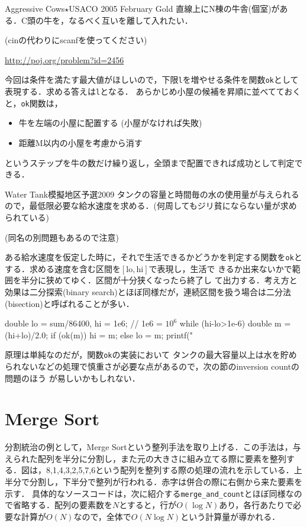 \begin{pbox}{Aggressive Cows$\star{}$}{USACO 2005 February Gold}
直線上にN棟の牛舎(個室)がある．C頭の牛を，なるべく互いを離して入れたい．

(cinの代わりにscanfを使ってください)

\url{http://poj.org/problem?id=2456}
\end{pbox}

今回は条件を満たす最大値がほしいので，下限\texttt{l}を増やせる条件を関数\texttt{ok}として表現する．求める答えは\texttt{l}となる．
あらかじめ小屋の候補を昇順に並べてておくと，\texttt{ok}関数は，
\begin{itemize}
\setlength{\itemsep}{0pt}
\item 牛を左端の小屋に配置する (小屋がなければ失敗)
\item 距離M以内の小屋を考慮から消す
\end{itemize}
というステップを牛の数だけ繰り返し，全頭まで配置できれば成功として判定できる．


\begin{pbox}{Water Tank}{模擬地区予選2009}
タンクの容量と時間毎の水の使用量が与えられるので，最低限必要な給水速度を求める．(何周してもジリ貧にならない量が求められている)

(同名の別問題もあるので注意)

\end{pbox}

ある給水速度を仮定した時に，それで生活できるかどうかを判定する関数を\texttt{ok}とする．求める速度を含む区間を$[\text{lo},\text{hi}]$で表現し，生活で
きるか出来ないかで範囲を半分に狭めてゆく．区間が十分狭くなったら終了し
て出力する．考え方と効果は二分探索(binary search)とほぼ同様だが，連続区間を扱う場合は二分法 (bisection)と呼ばれることが多い．

\begin{cbox}
  double lo = sum/86400, hi = 1e6; // 1e6 = $10^6$
  while (hi-lo>1e-6) {
      double m = (hi+lo)/2.0;
      if (ok(m)) hi = m;
      else lo = m;
  }
  printf("
\end{cbox}

原理は単純なのだが，関数\texttt{ok}の実装において
タンクの最大容量以上は水を貯められないなどの処理で慎重さが必要な点があるので，次の節のinversion countの問題のほう
が易しいかもしれない．

\section{Merge Sort}
分割統治の例として，Merge Sortという整列手法を取り上げる．この手法は，与えられた配列を半分に分割し，また元の大きさに組み立てる際に要素を整列する．図は，8,1,4,3,2,5,7,6という配列を整列する際の処理の流れを示している．上半分で分割し，下半分で整列が行われる．赤字は併合の際に右側から来た要素を示す．
具体的なソースコードは，次に紹介する\texttt{merge\_and\_count}とほぼ同様なので省略する．配列の要素数を$N$とすると，行が$O(\log{}N)$あり，各行あたりで必要な計算が$O(N)$なので，全体で$O(N\log{}N)$という計算量が導かれる．

